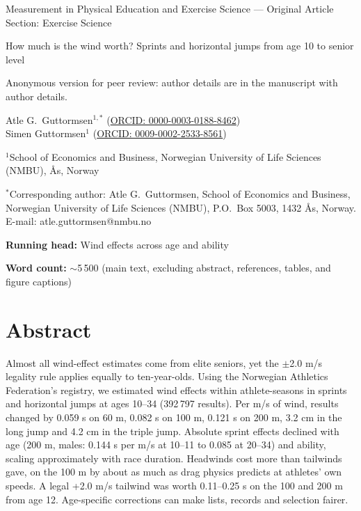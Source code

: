 \documentclass[12pt,a4paper]{article}
\begin{document}

\noindent Measurement in Physical Education and Exercise Science --- Original Article\\
Section: Exercise Science

\bigskip
{\noindent\Large\bfseries\raggedright{} How much is the wind worth? Sprints and horizontal jumps from age 10 to senior level\par}

\ifdefined\anonymous
\bigskip
\noindent Anonymous version for peer review: author details are in the manuscript with author details.

\medskip
\else
\bigskip
\noindent Atle G.\ Guttormsen$^{1,*}$ (\href{https://orcid.org/0000-0003-0188-8462}{ORCID: 0000-0003-0188-8462})\\
Simen Guttormsen$^{1}$ (\href{https://orcid.org/0009-0002-2533-8561}{ORCID: 0009-0002-2533-8561})

\medskip
\noindent $^1$School of Economics and Business, Norwegian University of Life Sciences (NMBU), Ås, Norway

\medskip
\noindent $^*$Corresponding author: Atle G.\ Guttormsen, School of Economics and Business, Norwegian University of Life Sciences (NMBU), P.O.\ Box 5003, 1432 Ås, Norway. E-mail: atle.guttormsen@nmbu.no

\medskip
\fi
\noindent \textbf{Running head:} Wind effects across age and ability

\noindent \textbf{Word count:} $\sim$5\,500 (main text, excluding abstract, references, tables, and figure captions)


\newpage
\section*{Abstract}

Almost all wind-effect estimates come from elite seniors, yet the $\pm$2.0 m/s legality rule applies equally to ten-year-olds. Using the Norwegian Athletics Federation's registry, we estimated wind effects within athlete-seasons in sprints and horizontal jumps at ages 10--34 (392\,797 results). Per m/s of wind, results changed by 0.059 s on 60 m, 0.082 s on 100 m, 0.121 s on 200 m, 3.2 cm in the long jump and 4.2 cm in the triple jump. Absolute sprint effects declined with age (200 m, males: 0.144 s per m/s at 10--11 to 0.085 at 20--34) and ability, scaling approximately with race duration. Headwinds cost more than tailwinds gave, on the 100 m by about as much as drag physics predicts at athletes' own speeds. A legal +2.0 m/s tailwind was worth 0.11--0.25 s on the 100 and 200 m from age 12. Age-specific corrections can make lists, records and selection fairer.
\end{document}
